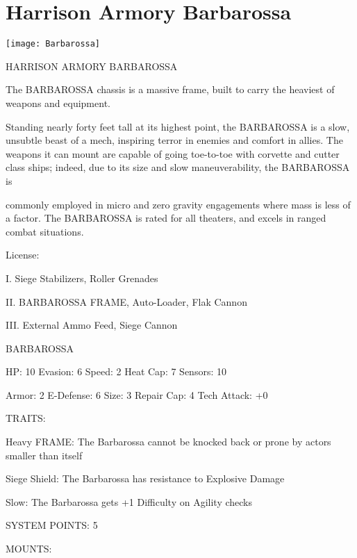 \section{Harrison Armory Barbarossa}


\centering\texttt{[image: Barbarossa]}

                           HARRISON ARMORY BARBAROSSA

The BARBAROSSA chassis is a massive frame, built to carry the heaviest of weapons and equipment.

Standing nearly forty feet tall at its highest point, the BARBAROSSA is a slow, unsubtle beast of a mech,
inspiring terror in enemies and comfort in allies. The weapons it can mount are capable of going toe-to-toe
with corvette and cutter class ships; indeed, due to its size and slow maneuverability, the BARBAROSSA is




commonly employed in micro and zero gravity engagements where mass is less of a factor. The
BARBAROSSA is rated for all theaters, and excels in ranged combat situations.

                                                  License:

I. Siege Stabilizers, Roller Grenades

II. BARBAROSSA FRAME, Auto-Loader, Flak Cannon

III. External Ammo Feed, Siege Cannon


                                            BARBAROSSA

 HP: 10         Evasion: 6                           Speed: 2           Heat Cap: 7       Sensors: 10

 Armor:  2      E-Defense: 6                         Size: 3            Repair Cap: 4     Tech Attack:
                                                                                          +0

                                                  TRAITS:

 Heavy FRAME: The Barbarossa cannot be knocked back or prone by actors smaller than itself

 Siege Shield: The Barbarossa has resistance to Explosive Damage

 Slow: The Barbarossa gets +1 Difficulty on Agility checks

                                           SYSTEM POINTS: 5

                                                 MOUNTS:


